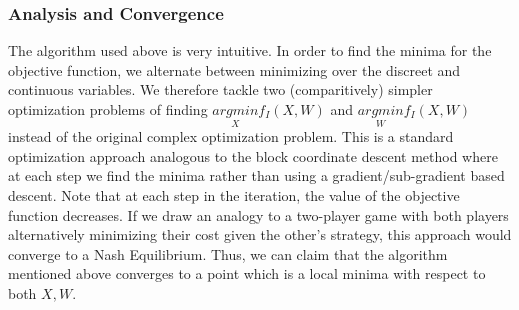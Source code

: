 \begin{algorithm}[H]
\medskip{}



\medskip{}

\caption{$solve(I)$}
\end{algorithm}



\subsubsection*{Analysis and Convergence}

The algorithm used above is very intuitive. In order to find the minima
for the objective function, we alternate between minimizing over the
discreet and continuous variables. We therefore tackle two (comparitively)
simpler optimization problems of finding $\underset{X}{argmin}f_{I}(X,W)$
and $\underset{W}{argmin}f_{I}(X,W)$ instead of the original complex
optimization problem. This is a standard optimization approach analogous
to the block coordinate descent method where at each step we find
the minima rather than using a gradient/sub-gradient based descent.
Note that at each step in the iteration, the value of the objective
function decreases. If we draw an analogy to a two-player game with
both players alternatively minimizing their cost given the other's
strategy, this approach would converge to a Nash Equilibrium. Thus,
we can claim that the algorithm mentioned above converges to a point
which is a local minima with respect to both $X,W$.